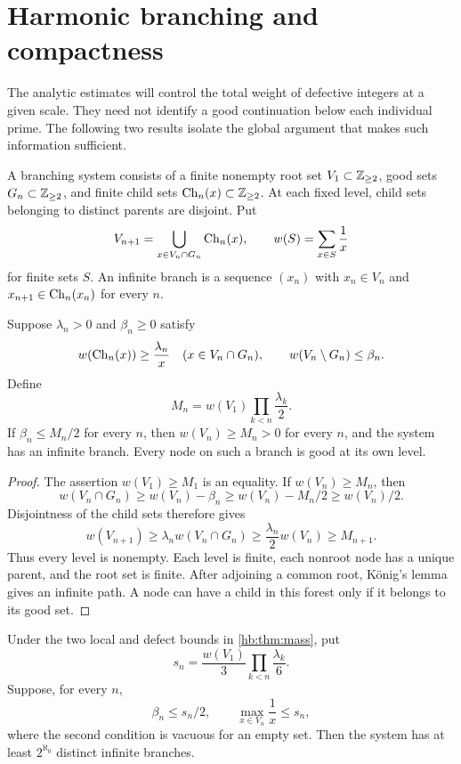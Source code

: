 \section{Harmonic branching and compactness}\label{hb:sec:mass}

The analytic estimates will control the total weight of defective
integers at a given scale.  They need not identify a good continuation
below each individual prime.  The following two results isolate the
global argument that makes such information sufficient.

\begin{definition}\label{hb:def:branching}
A branching system consists of a finite nonempty root set
$V_1\subset\mathbb Z_{\ge2}$, good sets $G_n\subset\mathbb Z_{\ge2}$, and finite
child sets $\operatorname{Ch}_n(x)\subset\mathbb Z_{\ge2}$.  At each fixed level, child
sets belonging to distinct parents are disjoint.  Put
\[
 V_{n+1}=\bigcup_{x\in V_n\cap G_n}\operatorname{Ch}_n(x),
 \qquad w(S)=\sum_{x\in S}\frac1x
\]
for finite sets $S$.  An infinite branch is a sequence $(x_n)$ with
$x_n\in V_n$ and $x_{n+1}\in\operatorname{Ch}_n(x_n)$ for every $n$.
\end{definition}

\begin{theorem}\label{hb:thm:mass}
Suppose $\lambda_n>0$ and $\beta_n\ge0$ satisfy
\[
 w(\operatorname{Ch}_n(x))\ge\frac{\lambda_n}{x}
       \quad(x\in V_n\cap G_n),
 \qquad w(V_n\setminus G_n)\le\beta_n.
\]
Define
\[
 M_n=w(V_1)\prod_{k<n}\frac{\lambda_k}{2}.
\]
If $\beta_n\le M_n/2$ for every $n$, then $w(V_n)\ge M_n>0$
for every $n$, and the system has an infinite branch.
Every node on such a branch is good at its own level.
\end{theorem}

\begin{proof}
The assertion $w(V_1)\ge M_1$ is an equality.  If
$w(V_n)\ge M_n$, then
\[
 w(V_n\cap G_n)\ge w(V_n)-\beta_n
       \ge w(V_n)-M_n/2\ge w(V_n)/2.
\]
Disjointness of the child sets therefore gives
\[
 w(V_{n+1})\ge\lambda_n w(V_n\cap G_n)
       \ge\frac{\lambda_n}{2}w(V_n)\ge M_{n+1}.
\]
Thus every level is nonempty.  Each level is finite, each nonroot
node has a unique parent, and the root set is finite.  After adjoining
a common root, K\"onig's lemma gives an infinite path.  A node can have
a child in this forest only if it belongs to its good set.
\end{proof}

\begin{corollary}
\label{hb:cor:binary}
Under the two local and defect bounds in \cref{hb:thm:mass}, put
\[
 s_n=\frac{w(V_1)}3\prod_{k<n}\frac{\lambda_k}{6}.
\]
Suppose, for every $n$,
\[
 \beta_n\le s_n/2,\qquad
 \max_{x\in V_n}\frac1x\le s_n,
 \tag{B}\label{hb:eq:binaryconditions}
\]
where the second condition is vacuous for an empty set.
Then the system has at least $2^{\aleph_0}$ distinct infinite branches.
\end{corollary}

